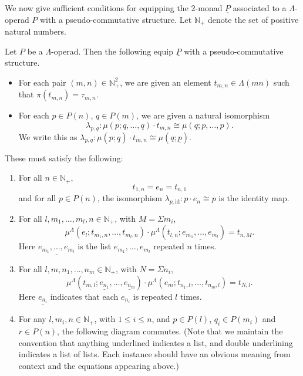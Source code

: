 \documentclass{amsbook} %
\numberwithin{section}{chapter}
\begin{document}
We now give sufficient conditions for equipping the 2-monad $\underline{P}$ associated to a $\Lambda$-operad $P$ with a pseudo-commutative structure.  Let $\mathbb{N}_{+}$ denote the set of positive natural numbers.
\begin{thm}\label{pscomm}
Let $P$ be a $\Lambda$-operad. Then the following equip $\underline{P}$ with a pseudo-commutative structure.
    \begin{itemize}
        \item For each pair $(m,n) \in \mathbb{N}_{+}^2$, we are given an element $t_{m,n} \in \Lambda(mn)$ such that $\pi(t_{m,n}) = \tau_{m,n}$.
        \item For each $p \in P(n)$, $q \in P(m)$, we are given a natural isomorphism
            \[
                \lambda_{p,q} \colon \mu(p;q,\ldots,q) \cdot t_{m,n} \cong \mu(q;p,\ldots,p).
            \]
            We write this as $\lambda_{p,q}: \mu(p; \underline{q}) \cdot t_{m,n} \cong \mu(q; \underline{p})$.
    \end{itemize}
These must satisfy the following:
    \begin{enumerate}
        \item For all $n \in \mathbb{N}_+$,
            \[
                t_{1,n} = e_n = t_{n,1}
            \]
             and for all $p \in P(n)$, the isomorphism $\lambda_{p, \textrm{id}}: p \cdot e_n \cong p$ is the identity map.
        \item For all $l, m_1, \ldots, m_l, n \in \mathbb{N}_+$, with $M = \Sigma m_i$,
            \[
                \mu^{\Lambda}(e_l; t_{m_1,n}, \ldots, t_{m_l,n}) \cdot \mu^{\Lambda}(t_{l,n};\underline{e_{m_1},\ldots,e_{m_l}}) = t_{n,M}.
            \]
            Here $\underline{e_{m_1},\ldots,e_{m_l}}$ is the list $e_{m_{1}}, \ldots, e_{m_{l}}$ repeated $n$ times.
        \item For all $l, m, n_1,\ldots, n_m \in \mathbb{N}_+$, with $N = \Sigma n_i$,
            \[
                \mu^{\Lambda}(t_{m,l};\underline{e_{n_1}},\ldots,\underline{e_{n_m}}) \cdot \mu^{\Lambda}(e_m;t_{n_1,l},\ldots,t_{n_m,l}) = t_{N,l}.
            \]
            Here $\underline{e_{n_{i}}}$ indicates that each $e_{n_{i}}$ is repeated $l$ times.
        \item For any $l, m_i, n \in \mathbb{N}_+$, with $1 \leq i \leq n$, and $p \in P(l)$, $q_i \in P(m_i)$ and $r \in P(n)$, the following diagram commutes.  (Note that we maintain the convention that anything underlined indicates a list, and double underlining indicates a list of lists.  Each instance should have an obvious meaning from context and the equations appearing above.)

\end{enumerate}
\end{thm}
\end{document}
